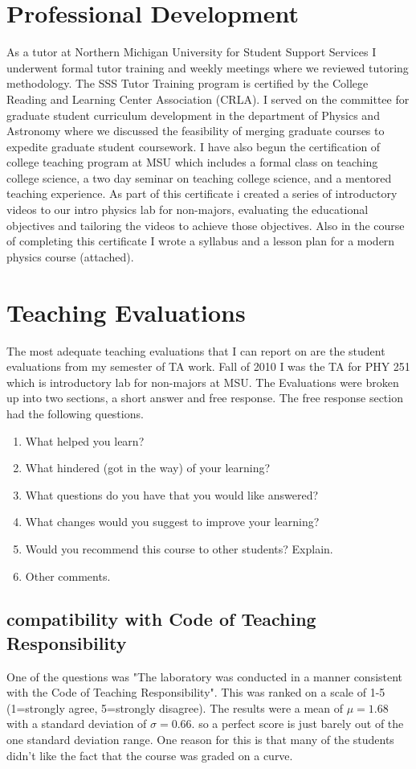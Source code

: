 \documentclass{article}
\begin{document}
\section{Professional Development}
As a tutor at Northern Michigan University for Student Support Services I underwent formal tutor training and weekly meetings where we reviewed tutoring methodology. The SSS Tutor Training program is certified by the College Reading and Learning Center Association (CRLA). 
I served on the committee for graduate student curriculum development in the department of Physics and Astronomy where we discussed the feasibility of merging graduate courses to expedite graduate student coursework. 
I have also begun the certification of college teaching program at MSU which includes a formal class on teaching college science, a two day seminar on teaching college science, and a mentored teaching experience. As part of this certificate i created a series of introductory videos to our intro physics lab for non-majors, evaluating the educational objectives and tailoring the videos to achieve those objectives. Also in the course of completing this certificate I wrote a syllabus and a lesson plan for a modern physics course (attached). 
\newpage


\section{Teaching Evaluations}
\hspace{0.5cm}The most adequate teaching evaluations that I can report on are the student evaluations from my semester of TA work. Fall of 2010 I was the TA for PHY 251 which is introductory lab for non-majors at MSU. 
The Evaluations were broken up into two sections, a short answer and free response. The free response section had the following questions. 
\begin{enumerate}
\item What helped you learn?
\item What hindered (got in the way) of your learning? 
\item What questions do you have that you would like answered?
\item What changes would you suggest to improve your learning?
\item Would you recommend this course to other students? Explain.
\item Other comments.
\end{enumerate}
\subsection{compatibility with Code of Teaching Responsibility}
\hspace{0.5cm}One of the questions was "The laboratory was conducted in a manner consistent with the Code of Teaching Responsibility". This was ranked on a scale of 1-5 (1=strongly agree, 5=strongly disagree). The results were a mean of $\mu=1.68$ with a standard deviation of $\sigma=0.66$. so a perfect score is just barely out of the one standard deviation range. One reason for this is that many of the students didn't like the fact that the course was graded on a curve. 
\end{document}
